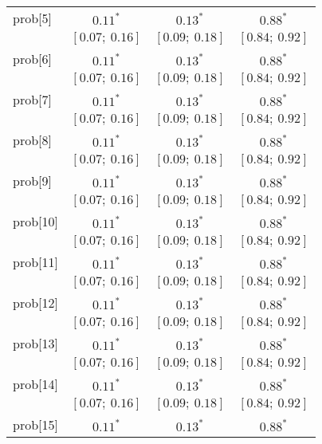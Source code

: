 \begin{table}
\begin{center}
\begin{tabular}{l c c c }
prob[5]   & $0.11^{*}$              & $0.13^{*}$              & $0.88^{*}$            \\
          & $[0.07;\ 0.16]$         & $[0.09;\ 0.18]$         & $[0.84;\ 0.92]$       \\
prob[6]   & $0.11^{*}$              & $0.13^{*}$              & $0.88^{*}$            \\
          & $[0.07;\ 0.16]$         & $[0.09;\ 0.18]$         & $[0.84;\ 0.92]$       \\
prob[7]   & $0.11^{*}$              & $0.13^{*}$              & $0.88^{*}$            \\
          & $[0.07;\ 0.16]$         & $[0.09;\ 0.18]$         & $[0.84;\ 0.92]$       \\
prob[8]   & $0.11^{*}$              & $0.13^{*}$              & $0.88^{*}$            \\
          & $[0.07;\ 0.16]$         & $[0.09;\ 0.18]$         & $[0.84;\ 0.92]$       \\
prob[9]   & $0.11^{*}$              & $0.13^{*}$              & $0.88^{*}$            \\
          & $[0.07;\ 0.16]$         & $[0.09;\ 0.18]$         & $[0.84;\ 0.92]$       \\
prob[10]  & $0.11^{*}$              & $0.13^{*}$              & $0.88^{*}$            \\
          & $[0.07;\ 0.16]$         & $[0.09;\ 0.18]$         & $[0.84;\ 0.92]$       \\
prob[11]  & $0.11^{*}$              & $0.13^{*}$              & $0.88^{*}$            \\
          & $[0.07;\ 0.16]$         & $[0.09;\ 0.18]$         & $[0.84;\ 0.92]$       \\
prob[12]  & $0.11^{*}$              & $0.13^{*}$              & $0.88^{*}$            \\
          & $[0.07;\ 0.16]$         & $[0.09;\ 0.18]$         & $[0.84;\ 0.92]$       \\
prob[13]  & $0.11^{*}$              & $0.13^{*}$              & $0.88^{*}$            \\
          & $[0.07;\ 0.16]$         & $[0.09;\ 0.18]$         & $[0.84;\ 0.92]$       \\
prob[14]  & $0.11^{*}$              & $0.13^{*}$              & $0.88^{*}$            \\
          & $[0.07;\ 0.16]$         & $[0.09;\ 0.18]$         & $[0.84;\ 0.92]$       \\
prob[15]  & $0.11^{*}$              & $0.13^{*}$              & $0.88^{*}$            \\

\end{tabular}
\end{center}
\end{table}
